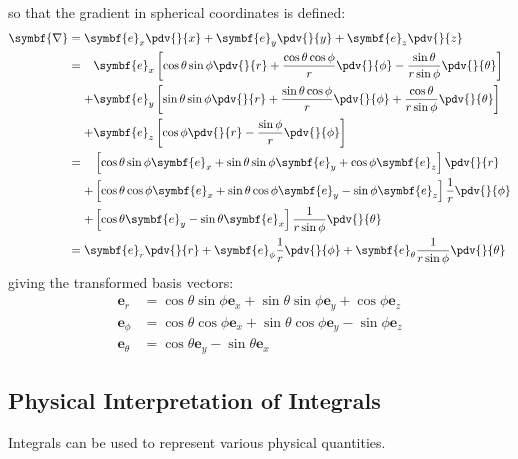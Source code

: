 \documentclass{article}
\begin{document}
so that the gradient in spherical coordinates is defined:
\begin{align*}
    \symbf{\nabla} & = \symbf{e}_x \pdv{}{x} + \symbf{e}_y \pdv{}{y} + \symbf{e}_z \pdv{}{z}                                                    \\
                   & =
    \begin{aligned}[t]
          & \symbf{e}_x \left[ \cos{\theta} \sin{\phi} \pdv{}{r} + \frac{\cos{\theta}\cos{\phi}}{r} \pdv{}{\phi} - \frac{\sin{\theta}}{r \sin{\phi}} \pdv{}{\theta} \right] \\
        + & \symbf{e}_y \left[ \sin{\theta} \sin{\phi} \pdv{}{r} + \frac{\sin{\theta}\cos{\phi}}{r} \pdv{}{\phi} + \frac{\cos{\theta}}{r \sin{\phi}} \pdv{}{\theta} \right] \\
        + & \symbf{e}_z \left[ \cos{\phi} \pdv{}{r} - \frac{\sin{\phi}}{r} \pdv{}{\phi} \right]
    \end{aligned}
    \\
                   & =
    \begin{aligned}[t]
          & \left[ \cos{\theta} \sin{\phi} \symbf{e}_x + \sin{\theta} \sin{\phi} \symbf{e}_y + \cos{\phi} \symbf{e}_z \right] \pdv{}{r}              \\
        + & \left[ \cos{\theta}\cos{\phi} \symbf{e}_x + \sin{\theta}\cos{\phi} \symbf{e}_y - \sin{\phi} \symbf{e}_z \right] \frac{1}{r} \pdv{}{\phi} \\
        + & \left[ \cos{\theta} \symbf{e}_y - \sin{\theta} \symbf{e}_x \right] \frac{1}{r \sin{\phi}} \pdv{}{\theta}
    \end{aligned}
    \\
                   & = \symbf{e}_r \pdv{}{r} + \symbf{e}_\phi \frac{1}{r} \pdv{}{\phi} + \symbf{e}_\theta \frac{1}{r \sin{\phi}} \pdv{}{\theta}
\end{align*}
giving the transformed basis vectors:
\begin{align*}
    \symbf{e}_r      & = \cos{\theta} \sin{\phi} \symbf{e}_x + \sin{\theta} \sin{\phi} \symbf{e}_y + \cos{\phi} \symbf{e}_z \\
    \symbf{e}_\phi   & = \cos{\theta}\cos{\phi} \symbf{e}_x + \sin{\theta}\cos{\phi} \symbf{e}_y - \sin{\phi} \symbf{e}_z   \\
    \symbf{e}_\theta & = \cos{\theta} \symbf{e}_y - \sin{\theta} \symbf{e}_x
\end{align*}
\subsection{Physical Interpretation of Integrals}
Integrals can be used to represent various physical quantities.
\end{document}
